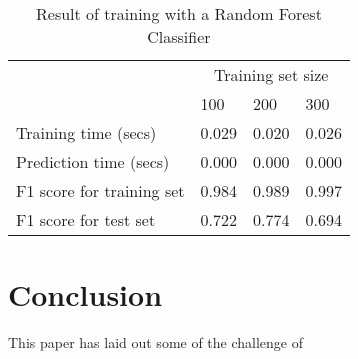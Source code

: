 \documentclass[12pt]{article}
\begin{document}
\setlength{\extrarowheight}{1.5pt}
\begin{table}[!htbp]
\caption{Result of training with a Random Forest Classifier} %
\centering %
\begin{tabular}{|p{6cm}|p{1.5cm}|p{1.5cm}|p{1.5cm}|} %
\hline %
& \multicolumn{3}{c|}{Training set size}\\[5pt]
\cline{2-4} 
& 100 & 200 & 300\\[0.5ex]
\hline %

Training time (secs)   &       0.029 & 0.020 & 0.026 \\
Prediction time (secs)   &     0.000 & 0.000 & 0.000 \\
F1 score for training set  &   0.984 & 0.989 & 0.997 \\
F1 score for test set    &     0.722 & 0.774 & 0.694 \\
\hline %
\end{tabular}
\label{randomForestClassifierTable}
\end{table}




\section*{Conclusion}

This paper has laid out some of the challenge of 













\end{document}

